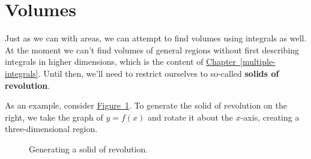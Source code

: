 \documentclass[10pt,]{book}
\newcommand{\terminology}[1]{\textbf{#1}}
\numberwithin{equation}{section}
\begin{document}
\section[{Volumes}]{Volumes}\label{section-volumes}
\hypertarget{p-627}{}%
Just as we can with areas, we can attempt to find volumes using integrals as well. At the moment we can't find volumes of general regions without first describing integrals in higher dimensions, which is the content of \hyperref[multiple-integrals]{Chapter~\ref{multiple-integrals}}. Until then, we'll need to restrict ourselves to so-called \terminology{solids of revolution}.%
\par
\hypertarget{p-628}{}%
As an example, consider \hyperref[figure-solid-revolution-1]{Figure~\ref{figure-solid-revolution-1}}. To generate the solid of revolution on the right, we take the graph of \(y = f(x)\) and rotate it about the \(x\)-axis, creating a three-dimensional region.%
\begin{figure}
\centering
\leavevmode%
\begin{sidebyside}{2}{0}{0}{0}%
\begin{sbspanel}{0.5}%
\end{sbspanel}%
\begin{sbspanel}{0.5}%
\end{sbspanel}%
\end{sidebyside}%
\caption{Generating a solid of revolution.\label{figure-solid-revolution-1}}
\end{figure}
\end{document}
